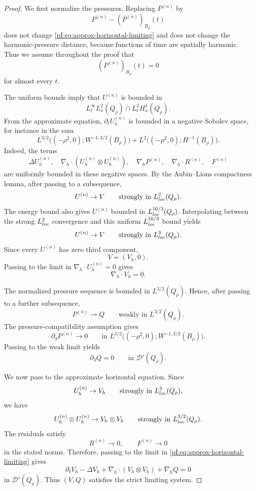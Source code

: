 \documentclass[10pt,a4paper]{amsart}
\newcommand{\divh}{\nabla_h\!\cdot}
\newcommand{\nabh}{\nabla_h}
\begin{document}
\begin{proof}
We first normalize the pressures.  Replacing \(P^{(n)}\) by
\[
        P^{(n)}-(P^{(n)})_{B_\rho}(t)
\]
does not change \eqref{pI:eq:approx-horizontal-limiting} and does not change the harmonic-pressure distance, because functions of time are spatially harmonic.  Thus we assume throughout the proof that
\[
        (P^{(n)})_{B_\rho}(t)=0
\]
for almost every \(t\).

The uniform bounds imply that \(U^{(n)}\) is bounded in
\[
        L^\infty_tL^2_x(Q_\rho)\cap L^2_tH^1_x(Q_\rho).
\]
From the approximate equation, \(\partial_tU_h^{(n)}\) is bounded in a negative Sobolev space, for instance in the sum
\[
        L^{3/2}\bigl((-\rho^2,0);W^{-1,3/2}(B_\rho)\bigr)
        +
        L^2\bigl((-\rho^2,0);H^{-1}(B_\rho)\bigr).
\]
Indeed, the terms
\[
        \Delta U_h^{(n)},\quad
        \divh(U_h^{(n)}\otimes U_h^{(n)}),\quad
        \nabh P^{(n)},\quad
        \divh R^{(n)},\quad
        F^{(n)}
\]
are uniformly bounded in these negative spaces.  By the Aubin--Lions compactness lemma, after passing to a subsequence,
\[
        U^{(n)}\to V
        \qquad\text{strongly in }L^2_{\rm loc}(Q_\rho).
\]
The energy bound also gives \(U^{(n)}\) bounded in \(L^{10/3}_{\rm loc}(Q_\rho)\).  Interpolating between the strong \(L^2_{\rm loc}\) convergence and this uniform \(L^{10/3}_{\rm loc}\) bound yields
\[
        U^{(n)}\to V
        \qquad\text{strongly in }L^3_{\rm loc}(Q_\rho).
\]
Since every \(U^{(n)}\) has zero third component,
\[
        V=(V_h,0).
\]
Passing to the limit in \(\divh U_h^{(n)}=0\) gives
\[
        \divh V_h=0 .
\]

The normalized pressure sequence is bounded in \(L^{3/2}(Q_\rho)\).  Hence, after passing to a further subsequence,
\[
        P^{(n)}\rightharpoonup Q
        \qquad\text{weakly in }L^{3/2}(Q_\rho).
\]
The pressure-compatibility assumption gives
\[
        \partial_3P^{(n)}\to0
        \qquad\text{in }
        L^{3/2}\bigl((-\rho^2,0);W^{-1,3/2}(B_\rho)\bigr).
\]
Passing to the weak limit yields
\[
        \partial_3Q=0
        \qquad\text{in }\mathcal D'(Q_\rho).
\]

We now pass to the approximate horizontal equation.  Since
\[
        U_h^{(n)}\to V_h
        \qquad\text{strongly in }L^3_{\rm loc}(Q_\rho),
\]
we have
\[
        U_h^{(n)}\otimes U_h^{(n)}
        \to
        V_h\otimes V_h
        \qquad\text{strongly in }L^{3/2}_{\rm loc}(Q_\rho).
\]
The residuals satisfy
\[
        R^{(n)}\to0,
        \qquad
        F^{(n)}\to0
\]
in the stated norms.  Therefore, passing to the limit in \eqref{pI:eq:approx-horizontal-limiting} gives
\[
        \partial_tV_h-\Delta V_h
        +\divh(V_h\otimes V_h)
        +\nabh Q=0
\]
in \(\mathcal D'(Q_\rho)\).  Thus \((V,Q)\) satisfies the strict limiting system.


\end{proof}
\end{document}
